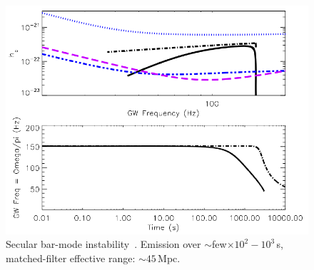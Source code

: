 \documentclass[serif,mathserif,10pt]{beamer}
\begin{document}
\begin{frame}
\begin{columns}
        \begin{center}
            \vspace{-0.1cm}
            \begin{figure}
                \includegraphics[width=1\columnwidth]{figures/corsi.png}
                \caption{Secular bar-mode instability~\cite{corsi:09}.
                Emission over $\sim$few$\times 10^2-10^3$\,s, matched-filter
            effective range: $\sim 45$\,Mpc.}
            \end{figure}
        \end{center}

    \end{columns}


\end{frame}
\end{document}
